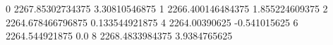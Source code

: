 0 2267.85302734375 3.30810546875
1 2266.400146484375 1.855224609375
2 2264.678466796875 0.133544921875
4 2264.00390625 -0.541015625
6 2264.544921875 0.0
8 2268.4833984375 3.9384765625
